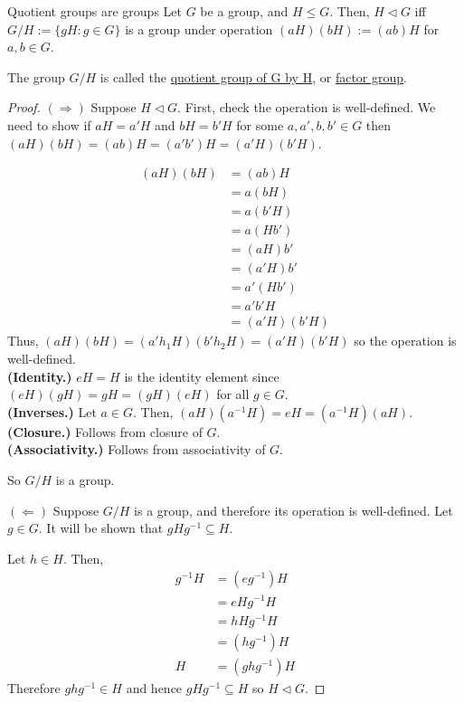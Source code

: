 \documentclass[12pt]{article}
\newcommand{\inv}{^{-1}}
\begin{document}
	\begin{mythm}{Quotient groups are groups}{}
		Let $G$ be a group, and $H\leq G$. Then, $H\lhd G$ iff $G/H:=\{gH:g\in G\}$ is a group under operation $(aH)(bH):=(ab)H$ for $a, b\in G$.
		
		The group $G/H$ is called the \underline{quotient group of G by H}, or \underline{factor group}.
		\begin{proof}
			$(\Longrightarrow)$ Suppose $H\lhd G$. First, check the operation is well-defined. We need to show if $aH=a'H$ and $bH=b'H$ for some $a, a', b, b'\in G$ then $(aH)(bH)=(ab)H=(a'b')H=(a'H)(b'H)$.
			
			\begin{align*}
				(aH)(bH)&=(ab)H\\
				&=a(bH)\\
				&=a(b'H)\\
				&=a(Hb')\\
				&=(aH)b'\\
				&=(a'H)b'\\
				&=a'(Hb')\\
				&=a'b'H\\
				&=(a'H)(b'H)
			\end{align*}
			Thus, $(aH)(bH)=(a'h_1H)(b'h_2H)=(a'H)(b'H)$ so the operation is well-defined.\\
			
			\textbf{(Identity.)} $eH=H$ is the identity element since $(eH)(gH)=gH=(gH)(eH)$ for all $g\in G$.\\
			
			\textbf{(Inverses.)} Let $a\in G$. Then, $(aH)(a\inv H)=eH=(a\inv H)(aH)$.\\
			
			\textbf{(Closure.)} Follows from closure of $G$.\\
			
			\textbf{(Associativity.)} Follows from associativity of $G$.
			
			So $G/H$ is a group.
			
			$(\Longleftarrow)$ Suppose $G/H$ is a group, and therefore its operation is well-defined. Let $g\in G$. It will be shown that $gHg\inv\subseteq H$.
			
			Let $h\in H$. Then,
			\begin{align*}
				g\inv H&=(eg\inv)H\\
				&=eHg\inv H\\
				&=hHg\inv H\\
				&=(hg\inv)H\\
				H&=(ghg\inv)H
			\end{align*}
			Therefore $ghg\inv\in H$ and hence $gHg\inv\subseteq H$ so $H\lhd G$.
		\end{proof}
	\end{mythm}
	
\end{document}
